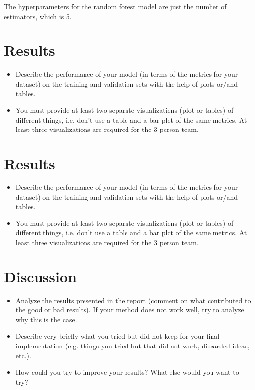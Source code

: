 \documentclass[a4, 10 pt, conference]{ieeeconf}  %
\begin{document}
The hyperparameters for the random forest model are just the number of estimators, which is 5.

\section{Results}
\label{sec:results}

{\color{blue}

  \begin{itemize}
    \item Describe the performance of your model (in terms of the metrics for your dataset) on the training and validation sets with the help of plots or/and tables.
    \item You must provide at least two separate visualizations
          (plot or tables) of different things, i.e. don’t use a table
          and a bar plot of the same metrics. At least three
          visualizations are required for the 3 person team.
  \end{itemize}
}
\section{Results}
\label{sec:results}

{\color{blue}

  \begin{itemize}
    \item Describe the performance of your model (in terms of the metrics for your dataset) on the training and validation sets with the help of plots or/and tables.
    \item You must provide at least two separate visualizations
          (plot or tables) of different things, i.e. don’t use a table
          and a bar plot of the same metrics. At least three
          visualizations are required for the 3 person team.
  \end{itemize}
}

\section{Discussion}
\label{sec:discuss}

{\color{blue}
  \begin{itemize}
    \item Analyze the results presented in the report (comment on what contributed to the good or bad results). If your method does not work well, try to analyze why this is the case.
    \item Describe very briefly what you tried but did not keep for your final implementation (e.g. things you tried but that did not work, discarded ideas, etc.).
    \item How could you try to improve your results? What else would you want to try?

  \end{itemize}
}
\end{document}
